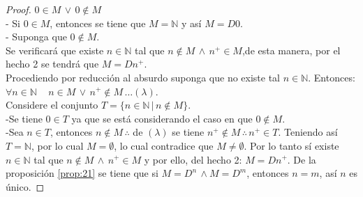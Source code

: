 \begin{proof}
    $0 \in M \, \lor \, 0 \notin M$ \\
    - Si $0\in M$, entonces se tiene que $M = \mathbb{N}$ y así $M=D0$.\\
    - Suponga que $0\notin M$.\\
    Se verificará que existe $n \in \mathbb{N}$ tal que $n \notin M \, \land \,
    n^+ \in M$,de esta manera, por el hecho 2 se tendrá que $M=Dn^+$. \\
    Procediendo por reducción al absurdo suponga que no existe tal $n \in
    \mathbb{N}$. Entonces: $\forall n \in \mathbb{N}  \, \quad n \in M \, \lor
    \, n^+ \notin M\, \ldots (\lambda)$. \\
    Considere el conjunto $T = \{n\in \mathbb{N} \, | \, n \notin M\}$.\\
    -Se tiene $0 \in T$ ya que se está considerando el caso en que $0 \notin M$.
    \\
    -Sea $n \in T$, entonces $n \notin M\, \therefore$ de $(\lambda)$ se tiene
    $n^+ \notin M \, \therefore \, n^+ \in T$. Teniendo así $T = \mathbb{N}$,
    por lo cual $M = \emptyset$, lo cual contradice que $M \neq \emptyset$. Por
    lo tanto sí existe $n \in \mathbb{N}$ tal que $n \notin M \, \land \, n^+
    \in M$ y por ello, del hecho 2: $M=Dn^+$. De la proposición \ref{prop:21} se
    tiene que si $M=D^n \, \land M = D^m$, entonces $n=m$, así $n$ es único.
\end{proof}

